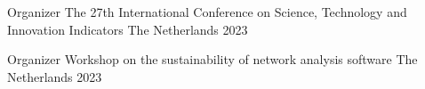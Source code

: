 

\begin{cvhonors}

  \cvhonor
    {Organizer} %
    {The 27th International Conference on Science, Technology and Innovation Indicators} %
    {The Netherlands} %
    {2023} %

  \cvhonor
    {Organizer} %
    {Workshop on the sustainability of network analysis software} %
    {The Netherlands} %
    {2023} %

\end{cvhonors}
